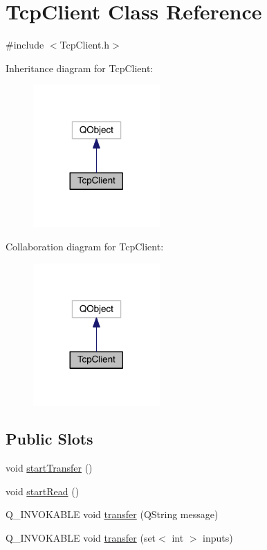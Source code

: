 \hypertarget{class_tcp_client}{\section{Tcp\+Client Class Reference}
\label{class_tcp_client}
}


{\ttfamily \#include $<$Tcp\+Client.\+h$>$}



Inheritance diagram for Tcp\+Client\+:\nopagebreak
\begin{figure}[H]
\begin{center}
\leavevmode
\includegraphics[width=137pt]{class_tcp_client__inherit__graph}
\end{center}
\end{figure}


Collaboration diagram for Tcp\+Client\+:\nopagebreak
\begin{figure}[H]
\begin{center}
\leavevmode
\includegraphics[width=137pt]{class_tcp_client__coll__graph}
\end{center}
\end{figure}
\subsection*{Public Slots}
\begin{DoxyCompactItemize}
\item 
void \hyperlink{class_tcp_client_a5a0dbf82b5eefc272f049718b160bfc1}{start\+Transfer} ()
\item 
void \hyperlink{class_tcp_client_a723aa34c6881907e19e0361dcea2e7e8}{start\+Read} ()
\item 
Q\+\_\+\+I\+N\+V\+O\+K\+A\+B\+L\+E void \hyperlink{class_tcp_client_acfb86166367f64f015abb8f625559e78}{transfer} (Q\+String message)
\item 
Q\+\_\+\+I\+N\+V\+O\+K\+A\+B\+L\+E void \hyperlink{class_tcp_client_ac893e0e784ed793d6d86447a8d63a193}{transfer} (set$<$ int $>$ inputs)
\end{DoxyCompactItemize}
